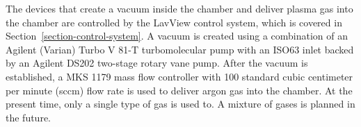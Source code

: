 The devices that create a vacuum inside the chamber and deliver plasma gas into the chamber are controlled by the LavView control system, which is covered in Section~\ref{section-control-system}. A vacuum is created using a combination of an Agilent (Varian) Turbo V 81-T turbomolecular pump with an ISO63 inlet backed by an Agilent DS202 two-stage rotary vane pump. After the vacuum is established, a MKS 1179 mass flow controller with 100 standard cubic centimeter per minute (sccm) flow rate is used to deliver argon gas into the chamber. At the present time, only a single type of gas is used to. A mixture of gases is planned in the future.





